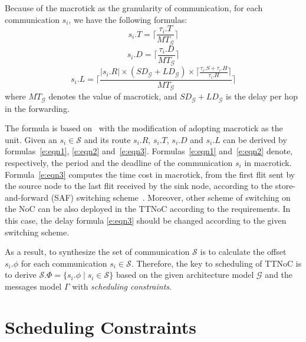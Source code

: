 \documentclass[journal]{IEEEtran}
\newcommand{\calG}{\mathcal{G}}
\newcommand{\calS}{\mathcal{S}}
\newcommand{\SD}{\mathit{SD}_\calG}
\newcommand{\HD}{\mathit{LD}_\calG}
\newcommand{\MT}{\mathit{MT}_\calG}
\theoremstyle{remark}
\begin{document}
Because of the macrotick as the granularity of communication,
 for each communication $s_{i}$,
   we have the following formulas:
\begin{equation}
\label{e:eqn1}
  s_i.T = \lceil\frac{\tau_{i}.T}{\MT} \rceil
\end{equation}
\begin{equation}
\label{e:eqn2}
  s_i.D = \lceil\frac{\tau_{i}.D}{\MT}\rceil
\end{equation}
\begin{equation}
\label{e:eqn3}
  s_i.L = \lceil\frac{|s_i.R| \times (\SD+\HD) \times
    \lceil\frac{\tau_{i}.S + \tau_{i}.H}{\tau_{i}.H  }\rceil}{\MT}\rceil
\end{equation}   
where $\MT$ denotes the value of macrotick,
 and $\SD+\HD$ is the delay per hop in the forwarding.

The formula is based on~\cite{DBLP:books/daglib/0087651} with the
modification of adopting macrotick as the unit.  Given an
$s_{i}\in\calS$ and its route $s_i.R$, $s_i.T$, $s_i.D$ and $s_i.L$
can be derived by formulas~\ref{e:eqn1}, \ref{e:eqn2}
and~\ref{e:eqn3}.  Formulas~\ref{e:eqn1} and~\ref{e:eqn2} denote,
respectively, the period and the deadline of the communication $s_i$
in macrotick.  Formula~\ref{e:eqn3} computes the time cost in
macrotick, from the first flit sent by the source node to the last
flit received by the sink node, according to the store-and-forward
(SAF) switching scheme~\cite{DBLP:books/daglib/0087651}.  Moreover,
other scheme of switching on the NoC can be also deployed in the TTNoC
according to the requirements. In this case, the delay formula
\ref{e:eqn3} should be changed according to the given switching
scheme.

As a result, to synthesize the set of communication $\calS$ is to
calculate the offset $s_i.\phi$ for each communication
$s_i\in\calS$. Therefore, the key to scheduling of TTNoC is to derive
$\calS.\Phi = \{s_i.\phi\mid s_i\in\calS\}$ based on the given
architecture model $\calG$ and the messages model $\Gamma$ with
\emph{scheduling constraints}.


\section{Scheduling Constraints\label{s:constraint}}
\end{document}
